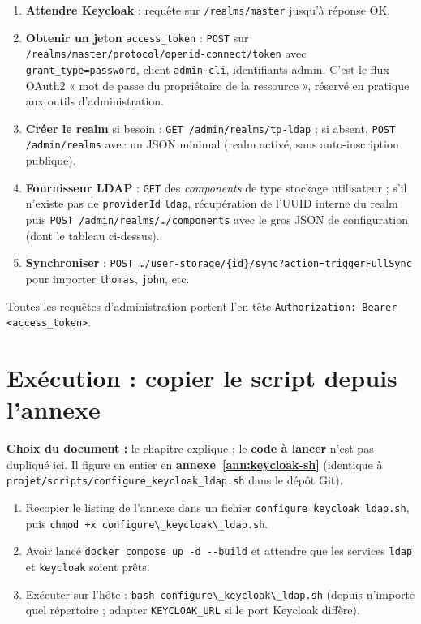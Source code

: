 \documentclass[11pt,a4paper]{report}
\newcommand{\bash}[1]{\lstinline[style=bashstyle, basicstyle=\ttfamily]{#1}}
\begin{document}
\begin{enumerate}[leftmargin=*]
  \item \textbf{Attendre Keycloak} : requête sur \texttt{/realms/master} jusqu'à réponse OK.
  \item \textbf{Obtenir un jeton} \texttt{access\_token} : \texttt{POST} sur \texttt{/realms/master/protocol/openid-connect/token} avec \texttt{grant\_type=password}, client \texttt{admin-cli}, identifiants admin. C'est le flux OAuth2 « mot de passe du propriétaire de la ressource », réservé en pratique aux outils d'administration.
  \item \textbf{Créer le realm} si besoin : \texttt{GET /admin/realms/tp-ldap} ; si absent, \texttt{POST /admin/realms} avec un JSON minimal (realm activé, sans auto-inscription publique).
  \item \textbf{Fournisseur LDAP} : \texttt{GET} des \emph{components} de type stockage utilisateur ; s'il n'existe pas de \texttt{providerId} \texttt{ldap}, récupération de l'UUID interne du realm puis \texttt{POST /admin/realms/\dots/components} avec le gros JSON de configuration (dont le tableau ci-dessus).
  \item \textbf{Synchroniser} : \texttt{POST \dots/user-storage/\{id\}/sync?action=triggerFullSync} pour importer \texttt{thomas}, \texttt{john}, etc.
\end{enumerate}

Toutes les requêtes d'administration portent l'en-tête \texttt{Authorization: Bearer <access\_token>}.

\section{Exécution : copier le script depuis l'annexe}

\textbf{Choix du document :} le chapitre explique ; le \textbf{code à lancer} n'est pas dupliqué ici. Il figure en entier en \textbf{annexe~\ref{ann:keycloak-sh}} (identique à \texttt{projet/scripts/configure\_keycloak\_ldap.sh} dans le dépôt Git).

\begin{enumerate}[leftmargin=*]
  \item Recopier le listing de l'annexe dans un fichier \texttt{configure\_keycloak\_ldap.sh}, puis \bash{chmod +x configure\_keycloak\_ldap.sh}.
  \item Avoir lancé \bash{docker compose up -d --build} et attendre que les services \texttt{ldap} et \texttt{keycloak} soient prêts.
  \item Exécuter sur l'hôte : \bash{bash configure\_keycloak\_ldap.sh} (depuis n'importe quel répertoire ; adapter \texttt{KEYCLOAK\_URL} si le port Keycloak diffère).
\end{enumerate}
\end{document}
